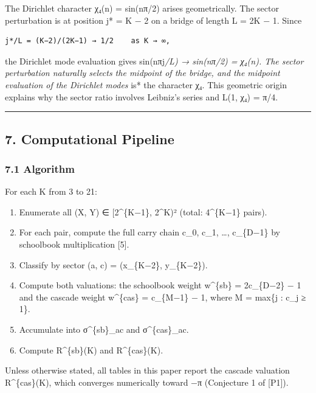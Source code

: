 \documentclass[
  11pt,
]{article}
\providecommand{\tightlist}{%
  \setlength{\itemsep}{0pt}\setlength{\parskip}{0pt}}
\begin{document}
The Dirichlet character χ₄(n) = sin(nπ/2) arises geometrically. The sector
perturbation is at position j* = K − 2 on a bridge of length L = 2K − 1. Since

\begin{verbatim}
j*/L = (K−2)/(2K−1) → 1/2    as K → ∞,
\end{verbatim}

the Dirichlet mode evaluation gives sin(nπj\emph{/L) → sin(nπ/2) = χ₄(n). The
sector perturbation naturally selects the midpoint of the bridge, and the
midpoint evaluation of the Dirichlet modes }is* the character χ₄. This geometric
origin explains why the sector ratio involves Leibniz's series and L(1, χ₄) =
π/4.

\begin{center}\rule{0.5\linewidth}{0.5pt}\end{center}

\newpage

\subsection{7. Computational Pipeline}\label{computational-pipeline}

\subsubsection{7.1 Algorithm}\label{algorithm}

For each K from 3 to 21:

\begin{enumerate}
\def\labelenumi{\arabic{enumi}.}
\tightlist
\item
  Enumerate all (X, Y) ∈ {[}2\^{}\{K−1\}, 2\^{}K)² (total: 4\^{}\{K−1\} pairs).
\item
  For each pair, compute the full carry chain c\_0, c\_1, \ldots, c\_\{D−1\} by
  schoolbook multiplication {[}5{]}.
\item
  Classify by sector (a, c) = (x\_\{K−2\}, y\_\{K−2\}).
\item
  Compute both valuations: the schoolbook weight w\^{}\{sb\} = 2c\_\{D−2\} − 1
  and the cascade weight w\^{}\{cas\} = c\_\{M−1\} − 1, where M = max\{j : c\_j
  ≥ 1\}.
\item
  Accumulate into σ\^{}\{sb\}\_ac and σ\^{}\{cas\}\_ac.
\item
  Compute R\^{}\{sb\}(K) and R\^{}\{cas\}(K).
\end{enumerate}

Unless otherwise stated, all tables in this paper report the cascade valuation
R\^{}\{cas\}(K), which converges numerically toward −π (Conjecture 1 of
{[}P1{]}).
\end{document}
